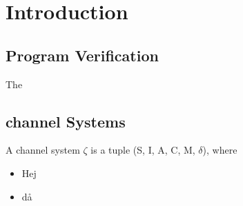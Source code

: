\section{Introduction}

\subsection{Program Verification}
The 

\subsection{channel Systems}
A channel system $\zeta$ is a tuple (S, I, A, C, M, $\delta$), where
\begin{itemize}
\item[]
Hej
\item[]
då
\end{itemize}
